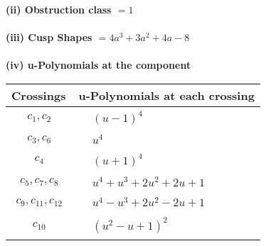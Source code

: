 \documentclass[1p]{elsarticle_modified}
\theoremstyle{definition}
\begin{document}
\flushleft \textbf{(ii) Obstruction class $= 1$}\\~\\
\flushleft \textbf{(iii) Cusp Shapes $= 4 a^3+3 a^2+4 a-8$}\\~\\
\newpage\renewcommand{\arraystretch}{1}
\flushleft \textbf{(iv) u-Polynomials at the component}\newline \\
\begin{tabular}{m{50pt}|m{274pt}}
Crossings & \hspace{64pt}u-Polynomials at each crossing \\
\hline $$\begin{aligned}c_{1},c_{2}\end{aligned}$$&$\begin{aligned}
&(u-1)^4
\end{aligned}$\\
\hline $$\begin{aligned}c_{3},c_{6}\end{aligned}$$&$\begin{aligned}
&u^4
\end{aligned}$\\
\hline $$\begin{aligned}c_{4}\end{aligned}$$&$\begin{aligned}
&(u+1)^4
\end{aligned}$\\
\hline $$\begin{aligned}c_{5},c_{7},c_{8}\end{aligned}$$&$\begin{aligned}
&u^4+u^3+2 u^2+2 u+1
\end{aligned}$\\
\hline $$\begin{aligned}c_{9},c_{11},c_{12}\end{aligned}$$&$\begin{aligned}
&u^4- u^3+2 u^2-2 u+1
\end{aligned}$\\
\hline $$\begin{aligned}c_{10}\end{aligned}$$&$\begin{aligned}
&(u^2- u+1)^2
\end{aligned}$\\
\hline
\end{tabular}\\~\\
\end{document}
